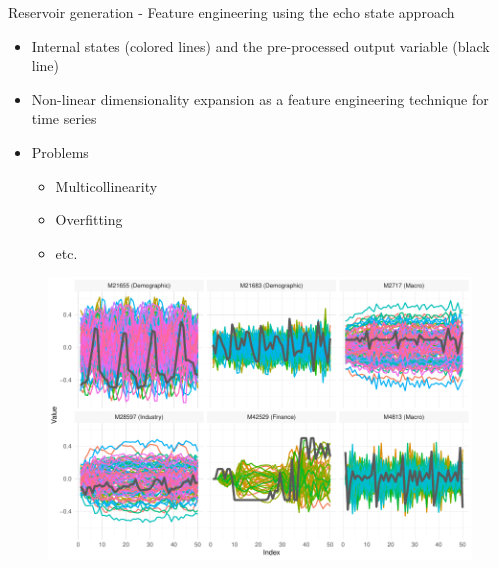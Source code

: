\documentclass[aspectratio=169]{beamer}
\begin{document}
\begin{frame}[t]{Reservoir generation - Feature engineering using the echo state approach}
    \begin{minipage}[t]{0.3\textwidth}
        \vspace{0pt}
        \begin{itemize}
            \item Internal states (colored lines) and the pre-processed output variable (black line)
			\item Non-linear dimensionality expansion as a feature engineering technique for time series
			\item Problems
				\begin{itemize}
					\item Multicollinearity
					\item Overfitting
					\item etc.
				\end{itemize}
        \end{itemize}
    \end{minipage}%
    \hfill
    \begin{minipage}[t]{0.7\textwidth}
        \vspace{0pt}
 		\begin{figure}[H]
		\center
			\includegraphics[scale=0.7]{figures/figure_05_model_states_wide.pdf}
		\end{figure}
    \end{minipage}
\end{frame}
\end{document}
